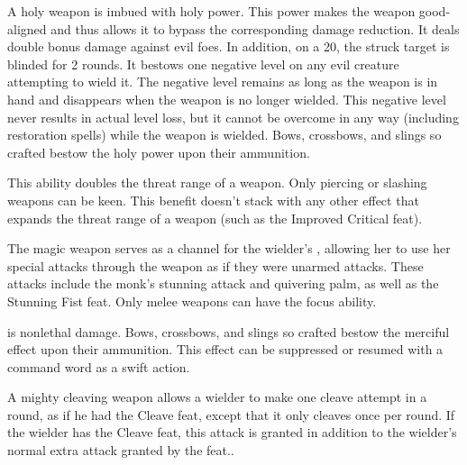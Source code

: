 
 A holy weapon is imbued with holy power. This power makes the weapon good-aligned and thus allows it to bypass the corresponding damage reduction. It deals double bonus damage against evil foes. In addition, on a 20, the struck target is blinded for 2 rounds. It bestows one negative level on any evil creature attempting to wield it. The negative level remains as long as the weapon is in hand and disappears when the weapon is no longer wielded. This negative level never results in actual level loss, but it cannot be overcome in any way (including restoration spells) while the weapon is wielded. Bows, crossbows, and slings so crafted bestow the holy power upon their ammunition.


 This ability doubles the threat range of a weapon. Only piercing or slashing weapons can be keen. This benefit doesn't stack with any other effect that expands the threat range of a weapon (such as the Improved Critical feat).


 The magic weapon serves as a channel for the wielder's \ki, allowing her to use her special \ki attacks through the weapon as if they were unarmed attacks. These attacks include the monk's stunning attack and quivering palm, as well as the Stunning Fist feat. Only melee weapons can have the \ki focus ability.


  is nonlethal damage. Bows, crossbows, and slings so crafted bestow the merciful effect upon their ammunition. This effect can be suppressed or resumed with a command word as a swift action.


 A mighty cleaving weapon allows a wielder to make one cleave attempt in a round, as if he had the Cleave feat, except that it only cleaves once per round. If the wielder has the Cleave feat, this attack is granted in addition to the wielder's normal extra attack granted by the feat..

